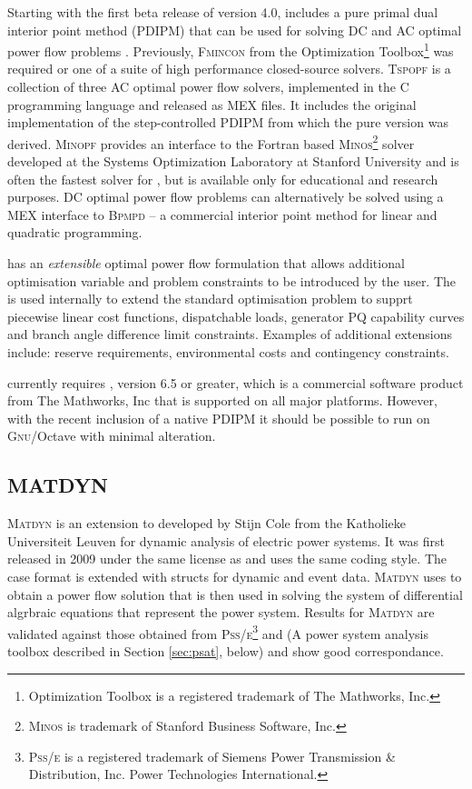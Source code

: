 Starting with the first beta release of version 4.0, \matpower includes a pure
\matlab primal dual interior point method (PDIPM) that can be used for solving
DC and AC optimal power flow problems \cite{zimmerman:ccv}.  Previously,
\textsc{Fmincon} from the \matlab Optimization Toolbox\footnote{Optimization
Toolbox is a registered trademark of The Mathworks, Inc.} was required or one
of a suite of high performance closed-source solvers.  \textsc{Tspopf} is a
collection of three AC optimal power flow solvers, implemented in the C
programming language and released as \matlab MEX files.  It includes
the original implementation of the step-controlled PDIPM from which the pure
\matlab version was derived.  \textsc{Minopf} provides an interface to the
Fortran based \textsc{Minos}\footnote{\textsc{Minos} is trademark of Stanford
Business Software, Inc.} solver developed at the Systems Optimization Laboratory at Stanford University and is often the fastest solver for \matpower, but is
available only for educational and research purposes.  DC optimal power flow
problems can alternatively be solved using a MEX interface to \textsc{Bpmpd} --
a commercial interior point method for linear and quadratic programming.

\matpower has an \textit{extensible} optimal power flow formulation that allows
additional optimisation variable and problem constraints to be introduced by
the user.  The is used internally to extend the standard optimisation problem
to supprt piecewise linear cost functions, dispatchable loads, generator PQ
capability curves and branch angle difference limit constraints.  Examples of
additional extensions include: reserve requirements, environmental costs and
contingency constraints.

\matpower currently requires \matlab, version 6.5 or greater, which is a
commercial software product from The Mathworks, Inc that is supported on all
major platforms.  However, with the recent inclusion of a native PDIPM it
should be possible to run \matpower on \textsc{Gnu}/Octave with minimal
alteration.

\subsection{MATDYN}
\textsc{Matdyn} is an extension to \matpower developed by Stijn Cole from the
Katholieke Universiteit Leuven for dynamic analysis of electric power systems.
It was first released in 2009 under the same license as \matpower and uses the
same coding style.  The \matpower case format is extended with structs
for dynamic and event data.  \textsc{Matdyn} uses \matpower to obtain a power flow solution that is then used in solving the system of differential algrbraic equations that represent the
power system.  Results for \textsc{Matdyn} are validated against those obtained from
\textsc{Pss/e}\footnote{\textsc{Pss/e} is a registered trademark of Siemens Power
Transmission \& Distribution, Inc. Power Technologies International.} and
\psat (A power system analysis toolbox described in Section \ref{sec:psat},
below) and show good correspondance.

